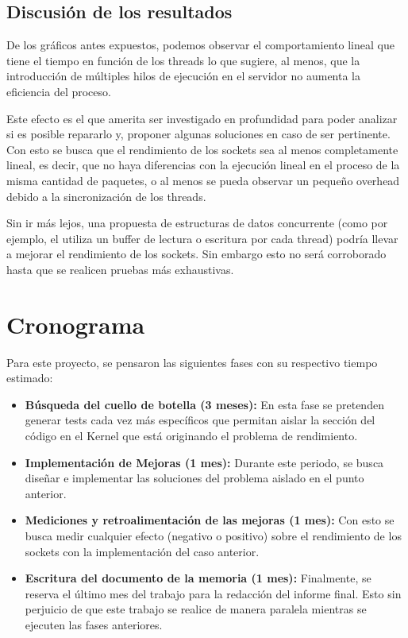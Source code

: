 \documentclass[12pt,spanish,letterpaper]{article}
\begin{document}
\subsection{Discusión de los resultados}
\par De los gráficos antes expuestos, podemos observar el comportamiento lineal que tiene el tiempo en función de los threads lo que sugiere, al menos, que la introducción de múltiples hilos de ejecución en el servidor no aumenta la eficiencia del proceso.
\par Este efecto es el que amerita ser investigado en profundidad para poder analizar si es posible repararlo y, proponer algunas soluciones en caso de ser pertinente. Con esto se busca que el rendimiento de los sockets sea al menos completamente lineal, es decir, que no haya diferencias con la ejecución lineal en el proceso de la misma cantidad de paquetes, o al menos se pueda observar un pequeño overhead debido a la sincronización de los threads.
\par Sin ir más lejos, una propuesta de estructuras de datos concurrente (como por ejemplo, el utiliza un buffer de lectura o escritura por cada thread) podría llevar a mejorar el rendimiento de los sockets. Sin embargo esto no será corroborado hasta que se realicen pruebas más exhaustivas.
\section{Cronograma}
\par Para este proyecto, se pensaron las siguientes fases con su respectivo tiempo estimado:
\begin{itemize}
	\item \textbf{Búsqueda del cuello de botella (3 meses):} En esta fase se pretenden generar tests cada vez más específicos que permitan aislar la sección del código en el Kernel que está originando el problema de rendimiento.
	\item \textbf{Implementación de Mejoras (1 mes):} Durante este periodo, se busca diseñar e implementar las soluciones del problema aislado en el punto anterior.
	\item \textbf{Mediciones y retroalimentación de las mejoras (1 mes):} Con esto se busca medir cualquier efecto (negativo o positivo) sobre el rendimiento de los sockets con la implementación del caso anterior.
	\item \textbf{Escritura del documento de la memoria (1 mes):} Finalmente, se reserva el último mes del trabajo para la redacción del informe final. Esto sin perjuicio de que este trabajo se realice de manera paralela mientras se ejecuten las fases anteriores.
\end{itemize}
\newpage
\end{document}
